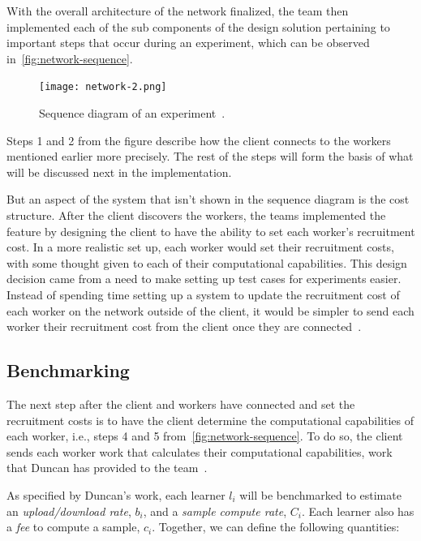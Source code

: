 \documentclass[../mthe-493-final-project.tex]{subfiles}
\begin{document}
    With the overall architecture of the network finalized, the team then implemented each of the sub components of the design solution pertaining to important steps that occur during an experiment, which can be observed in~\autoref{fig:network-sequence}.

    \begin{figure}
        \texttt{[image: network-2.png]}
        \caption{Sequence diagram of an experiment~\cite{group_a2_Optimization_Of_Data}.}
        \label{fig:network-sequence}
    \end{figure}

    Steps 1 and 2 from the figure describe how the client connects to the workers mentioned earlier more precisely. The rest of the steps will form the basis of what will be discussed next in the implementation.

    But an aspect of the system that isn't shown in the sequence diagram is the cost structure. After the client discovers the workers, the teams implemented the feature by designing the client to have the ability to set each worker's recruitment cost. In a more realistic set up, each worker would set their recruitment costs, with some thought given to each of their computational capabilities. This design decision came from a need to make setting up test cases for experiments easier. Instead of spending time setting up a system to update the recruitment cost of each worker on the network outside of the client, it would be simpler to send each worker their recruitment cost from the client once they are connected~\cite{group_a2_Optimization_Of_Data}. 
        
    \subsection{Benchmarking}
    \label{ssec:benchmarking}

    The next step after the client and workers have connected and set the recruitment costs is to have the client determine the computational capabilities of each worker, i.e., steps 4 and 5 from~\autoref{fig:network-sequence}. To do so, the client sends each worker work that calculates their computational capabilities, work that Duncan has provided to the team~\cite{Mays_Benchmarking}.

    As specified by Duncan's work, each learner $l_i$ will be benchmarked to estimate an \textit{upload/download rate}, $b_i$, and a \textit{sample compute rate}, $C_i$. Each learner also has a \textit{fee} to compute a sample, $c_i$. Together, we can define the following quantities:
\end{document}
